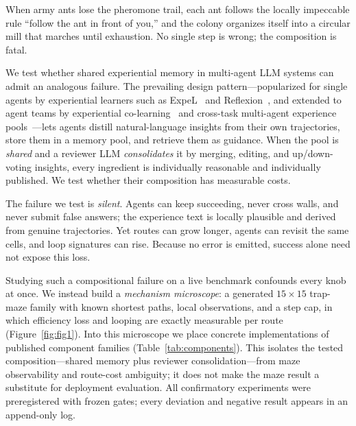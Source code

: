 \documentclass[letterpaper]{article} %
\begin{document}
When army ants lose the pheromone trail, each ant follows the locally impeccable rule
``follow the ant in front of you,'' and the colony organizes itself into a circular mill that
marches until exhaustion. No single step is wrong; the composition is fatal.

We test whether shared experiential memory in multi-agent LLM systems can admit an analogous
failure. The prevailing design pattern---popularized for single agents by
experiential learners such as ExpeL~\citep{zhao2024expel} and
Reflexion~\citep{shinn2023reflexion}, and extended to agent teams by experiential
co-learning~\citep{qian2024colearning} and cross-task multi-agent experience
pools~\citep{li2025mael}---lets agents distill natural-language insights from their own
trajectories, store them in a memory pool, and retrieve them as guidance. When the pool is
\emph{shared} and a reviewer LLM \emph{consolidates} it by merging, editing, and
up/down-voting insights, every ingredient is individually reasonable and individually
published. We test whether their composition has measurable costs.

The failure we test is \emph{silent}. Agents can keep succeeding, never cross walls, and never
submit false answers; the experience text is locally plausible and derived from genuine
trajectories. Yet routes can grow longer, agents can revisit the same cells, and loop
signatures can rise. Because no error is emitted, success alone need not expose this loss.

Studying such a compositional failure on a live benchmark confounds every knob at once. We
instead build a \emph{mechanism microscope}: a generated $15\times15$ trap-maze family with
known shortest paths, local observations, and a step cap, in which efficiency loss and
looping are exactly measurable per route (Figure~\ref{fig:fig1}). Into this microscope we
place concrete implementations of published component families
(Table~\ref{tab:components}). This isolates the tested composition---shared memory plus
reviewer consolidation---from maze observability and route-cost ambiguity; it does not make
the maze result a substitute for deployment evaluation. All confirmatory experiments were
preregistered with frozen gates; every deviation and negative result appears in an append-only
log.
\end{document}
